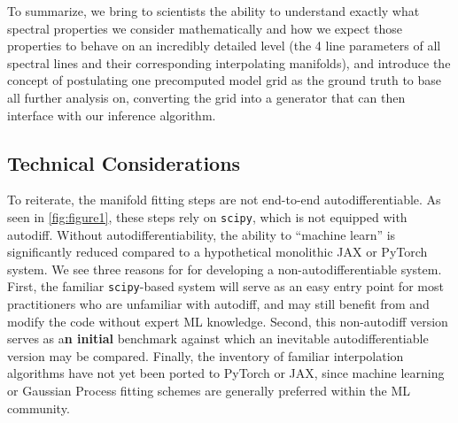 \documentclass[twocolumn, linenumbers]{aastex631}
\begin{document}
To summarize, we bring to scientists the ability to understand exactly what spectral properties we consider mathematically and how we expect those properties to behave on an incredibly detailed level (the 4 line parameters of all spectral lines and their corresponding interpolating manifolds), and introduce the concept of postulating one precomputed model grid as the ground truth to base all further analysis on, converting the grid into a generator that can then interface with our inference algorithm.

\subsection{Technical Considerations}
To reiterate, the manifold fitting steps are not end-to-end autodifferentiable.
As seen in \autoref{fig:figure1}, these steps rely on \texttt{scipy}, which is not equipped with autodiff.
Without autodifferentiability, the ability to ``machine learn'' is significantly reduced compared to a hypothetical monolithic JAX or PyTorch system.
We see three reasons for for developing a non-autodifferentiable system.
First, the familiar \texttt{scipy}-based system will serve as an easy entry point for most practitioners who are unfamiliar with autodiff, and may still benefit from and modify the code without expert ML knowledge.
Second, this non-autodiff version serves as a\textbf{n initial} benchmark against which an inevitable autodifferentiable version may be compared.
Finally, the inventory of familiar interpolation algorithms have not yet been ported to PyTorch or JAX, since machine learning or Gaussian Process fitting schemes are generally preferred within the ML community.
\end{document}
